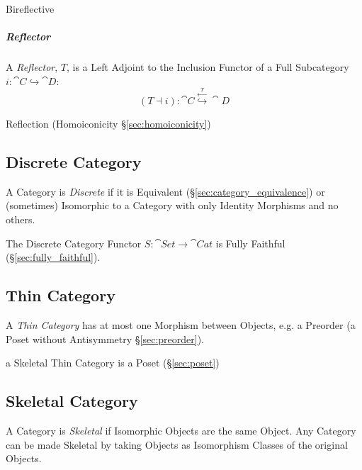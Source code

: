 Bireflective



\subparagraph{Reflector}\label{sec:reflector}\hfill


A \emph{Reflector}, $T$, is a Left Adjoint to the Inclusion Functor of
a Full Subcategory $i : \cat{C} \hookrightarrow \cat{D}$:
\[
  (T \dashv i) :
  \cat{C} \stackrel{\xleftarrow{T}}{\hookrightarrow} \cat{D}
\]

Reflection (Homoiconicity \S\ref{sec:homoiconicity})



\subsection{Discrete Category}\label{sec:discrete_category}

A Category is \emph{Discrete} if it is Equivalent
(\S\ref{sec:category_equivalence}) or (sometimes) Isomorphic to a
Category with only Identity Morphisms and no others.

The Discrete Category Functor $S : \cat{Set} \rightarrow
\cat{Cat}$ is Fully Faithful (\S\ref{sec:fully_faithful}).



\subsection{Thin Category}\label{sec:thin_category}

A \emph{Thin Category} has at most one Morphism between Objects, e.g.
a Preorder (a Poset without Antisymmetry \S\ref{sec:preorder}).

a Skeletal Thin Category is a Poset (\S\ref{sec:poset})



\subsection{Skeletal Category}\label{sec:skeletal_category}

A Category is \emph{Skeletal} if Isomorphic Objects are the same
Object. Any Category can be made Skeletal by taking Objects as
Isomorphism Classes of the original Objects.

